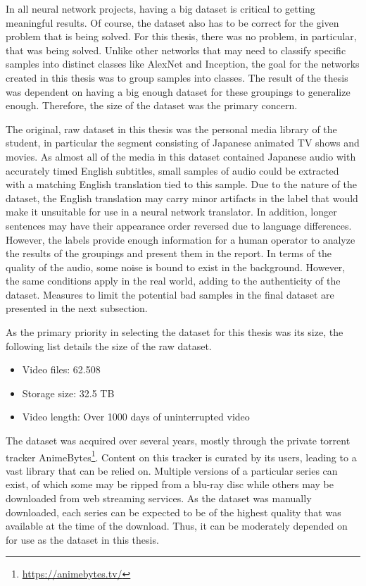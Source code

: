 In all neural network projects, having a big dataset is critical to getting meaningful results.
Of course, the dataset also has to be correct for the given problem that is being solved.
For this thesis, there was no problem, in particular, that was being solved.
Unlike other networks that may need to classify specific samples into distinct classes like AlexNet and Inception, the goal for the networks created in this thesis was to group samples into classes.
The result of the thesis was dependent on having a big enough dataset for these groupings to generalize enough.
Therefore, the size of the dataset was the primary concern.

The original, raw dataset in this thesis was the personal media library of the student, in particular the segment consisting of Japanese animated TV shows and movies.
As almost all of the media in this dataset contained Japanese audio with accurately timed English subtitles, small samples of audio could be extracted with a matching English translation tied to this sample.
Due to the nature of the dataset, the English translation may carry minor artifacts in the label that would make it unsuitable for use in a neural network translator.
In addition, longer sentences may have their appearance order reversed due to language differences.
However, the labels provide enough information for a human operator to analyze the results of the groupings and present them in the report.
In terms of the quality of the audio, some noise is bound to exist in the background.
However, the same conditions apply in the real world, adding to the authenticity of the dataset.
Measures to limit the potential bad samples in the final dataset are presented in the next subsection.

As the primary priority in selecting the dataset for this thesis was its size, the following list details the size of the raw dataset.
\begin{itemize}
    \item Video files: 62.508
    \item Storage size: 32.5 TB 
    \item Video length: Over 1000 days of uninterrupted video
\end{itemize}{}

The dataset was acquired over several years, mostly through the private torrent tracker AnimeBytes\footnote{\url{https://animebytes.tv/}}.
Content on this tracker is curated by its users, leading to a vast library that can be relied on.
Multiple versions of a particular series can exist, of which some may be ripped from a blu-ray disc while others may be downloaded from web streaming services.
As the dataset was manually downloaded, each series can be expected to be of the highest quality that was available at the time of the download.
Thus, it can be moderately depended on for use as the dataset in this thesis.

